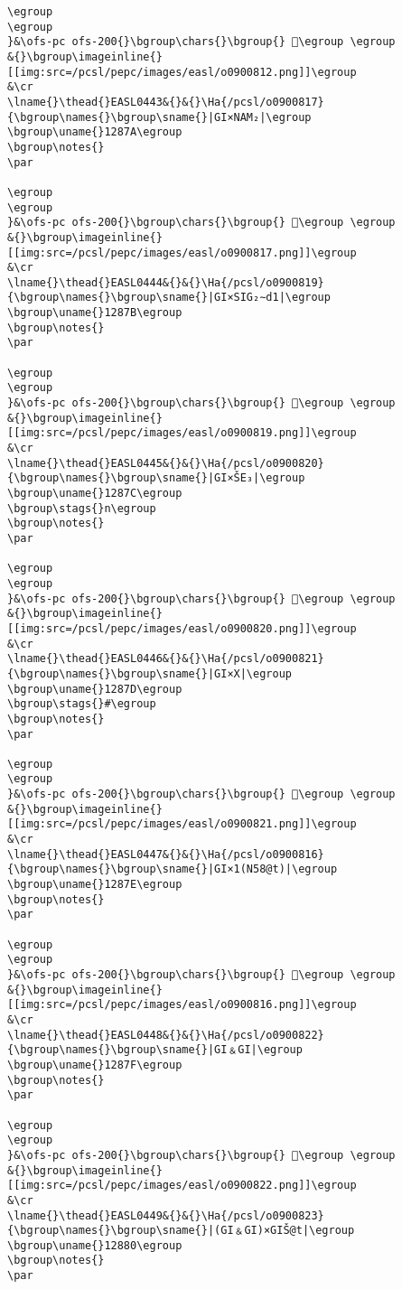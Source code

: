 \begin{verbatim}
\egroup
\egroup
}&\ofs-pc ofs-200{}\bgroup\chars{}\bgroup{} 𒡹\egroup \egroup
&{}\bgroup\imageinline{}[[img:src=/pcsl/pepc/images/easl/o0900812.png]]\egroup
&\cr
\lname{}\thead{}EASL0443&{}&{}\Ha{/pcsl/o0900817}{\bgroup\names{}\bgroup\sname{}|GI×NAM₂|\egroup
\bgroup\uname{}1287A\egroup
\bgroup\notes{}
\par 

\egroup
\egroup
}&\ofs-pc ofs-200{}\bgroup\chars{}\bgroup{} 𒡺\egroup \egroup
&{}\bgroup\imageinline{}[[img:src=/pcsl/pepc/images/easl/o0900817.png]]\egroup
&\cr
\lname{}\thead{}EASL0444&{}&{}\Ha{/pcsl/o0900819}{\bgroup\names{}\bgroup\sname{}|GI×SIG₂∼d1|\egroup
\bgroup\uname{}1287B\egroup
\bgroup\notes{}
\par 

\egroup
\egroup
}&\ofs-pc ofs-200{}\bgroup\chars{}\bgroup{} 𒡻\egroup \egroup
&{}\bgroup\imageinline{}[[img:src=/pcsl/pepc/images/easl/o0900819.png]]\egroup
&\cr
\lname{}\thead{}EASL0445&{}&{}\Ha{/pcsl/o0900820}{\bgroup\names{}\bgroup\sname{}|GI×ŠE₃|\egroup
\bgroup\uname{}1287C\egroup
\bgroup\stags{}n\egroup
\bgroup\notes{}
\par 

\egroup
\egroup
}&\ofs-pc ofs-200{}\bgroup\chars{}\bgroup{} 𒡼\egroup \egroup
&{}\bgroup\imageinline{}[[img:src=/pcsl/pepc/images/easl/o0900820.png]]\egroup
&\cr
\lname{}\thead{}EASL0446&{}&{}\Ha{/pcsl/o0900821}{\bgroup\names{}\bgroup\sname{}|GI×X|\egroup
\bgroup\uname{}1287D\egroup
\bgroup\stags{}#\egroup
\bgroup\notes{}
\par 

\egroup
\egroup
}&\ofs-pc ofs-200{}\bgroup\chars{}\bgroup{} 𒡽\egroup \egroup
&{}\bgroup\imageinline{}[[img:src=/pcsl/pepc/images/easl/o0900821.png]]\egroup
&\cr
\lname{}\thead{}EASL0447&{}&{}\Ha{/pcsl/o0900816}{\bgroup\names{}\bgroup\sname{}|GI×1(N58@t)|\egroup
\bgroup\uname{}1287E\egroup
\bgroup\notes{}
\par 

\egroup
\egroup
}&\ofs-pc ofs-200{}\bgroup\chars{}\bgroup{} 𒡾\egroup \egroup
&{}\bgroup\imageinline{}[[img:src=/pcsl/pepc/images/easl/o0900816.png]]\egroup
&\cr
\lname{}\thead{}EASL0448&{}&{}\Ha{/pcsl/o0900822}{\bgroup\names{}\bgroup\sname{}|GI﹠GI|\egroup
\bgroup\uname{}1287F\egroup
\bgroup\notes{}
\par 

\egroup
\egroup
}&\ofs-pc ofs-200{}\bgroup\chars{}\bgroup{} 𒡿\egroup \egroup
&{}\bgroup\imageinline{}[[img:src=/pcsl/pepc/images/easl/o0900822.png]]\egroup
&\cr
\lname{}\thead{}EASL0449&{}&{}\Ha{/pcsl/o0900823}{\bgroup\names{}\bgroup\sname{}|(GI﹠GI)×GIŠ@t|\egroup
\bgroup\uname{}12880\egroup
\bgroup\notes{}
\par 


\end{verbatim}
